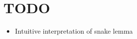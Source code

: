 \newpage
\section{TODO}
\begin{itemize}
    \item Intuitive interpretation of snake lemma
\end{itemize}
